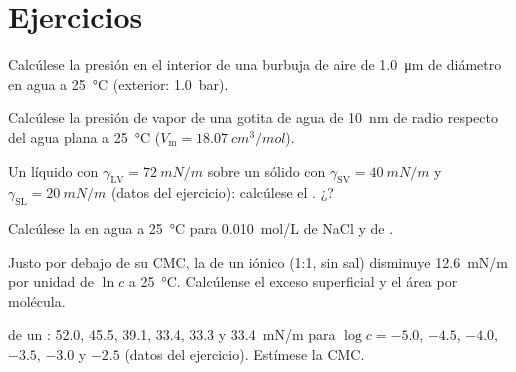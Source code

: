 \section{Ejercicios}

\begin{exercise}[$\star$]\label{exo:b3:colloids:1}
Calcúlese la presión en el interior de una burbuja de aire de \qty{1.0}{\micro m} de diámetro en agua a
\qty{25}{\celsius} (exterior: \qty{1.0}{bar}).
\end{exercise}

\begin{exercise}[$\star$]\label{exo:b3:colloids:2}
Calcúlese la presión de vapor de una gotita de agua de \qty{10}{nm} de radio respecto del
agua plana a \qty{25}{\celsius} ($V_{\mathrm m} = \qty{18.07}{cm^3/mol}$).
\end{exercise}

\begin{exercise}[$\star$]\label{exo:b3:colloids:3}
Un líquido con $\gamma_{\mathrm{LV}} = \qty{72}{mN/m}$ sobre un sólido con $\gamma_{\mathrm{SV}} = \qty{40}{mN/m}$ y $\gamma_{\mathrm{SL}} =
\qty{20}{mN/m}$ (datos del ejercicio): calcúlese el . ¿?
\end{exercise}

\begin{exercise}[$\star$]\label{exo:b3:colloids:4}
Calcúlese la  en agua a \qty{25}{\celsius} para \qty{0.010}{mol/L} de NaCl y de
.
\end{exercise}

\begin{exercise}[$\star\star$]\label{exo:b3:colloids:5}
Justo por debajo de su CMC, la  de un  iónico (1:1, sin sal)
disminuye \qty{12.6}{mN/m} por unidad de $\ln c$ a \qty{25}{\celsius}. Calcúlense el exceso superficial y
el área por molécula.
\end{exercise}

\begin{exercise}[$\star\star$]\label{exo:b3:colloids:6}
 de un : 52.0, 45.5, 39.1, 33.4, 33.3 y
\qty{33.4}{mN/m} para $\log c = -5.0$, $-4.5$, $-4.0$, $-3.5$, $-3.0$ y $-2.5$ (datos del ejercicio).
Estímese la CMC.
\end{exercise}

